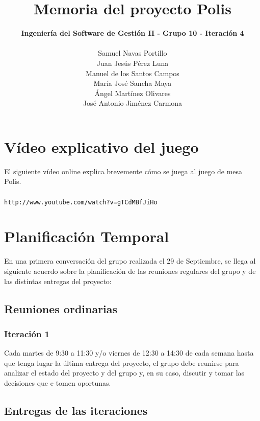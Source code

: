 \documentclass[11 pt]{book}
\begin{document}
\title{\textbf {\Huge Memoria del proyecto Polis}}
\author{
	\textbf {Ingeniería del Software de Gestión II - Grupo 10 - Iteración 4}\\\\
	Samuel Navas Portillo\\
	Juan Jesús Pérez Luna\\
	Manuel de los Santos Campos\\
	María José Sancha Maya\\
	Ángel Martínez Olivares\\
	José Antonio Jiménez Carmona}
\maketitle
\tableofcontents{}

\chapter{Vídeo explicativo del juego}
	El siguiente vídeo online explica brevemente cómo se juega al juego de mesa Polis.\\ \\
	\texttt{http://www.youtube.com/watch?v=gTCdMBfJiHo}
	
\chapter{Planificación Temporal}
	En una primera conversación del grupo realizada el 29 de Septiembre, se llega al siguiente acuerdo sobre la planificación de las reuniones regulares del grupo y de las distintas entregas del proyecto:\\

    \section{Reuniones ordinarias}
        \subsection*{Iteración 1}
	        Cada martes de 9:30 a 11:30 y/o viernes de 12:30 a 14:30 de cada semana hasta que tenga lugar la última entrega del proyecto, el grupo debe reunirse para analizar el estado del proyecto y del grupo y, en su caso, discutir y tomar las decisiones que e tomen oportunas.\\

    \section{Entregas de las iteraciones}
\end{document}
